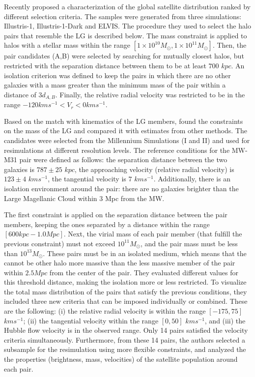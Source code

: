 \documentclass[fleqn,usenatbib]{mnras}
\begin{document}
Recently \cite{2018MNRAS.478.5533F} proposed a characterization of the
global satellite distribution ranked by different selection
criteria. The samples were generated from three simulations:
Illustris-1, Illustris-1-Dark and ELVIS. The procedure they used to
select the halo pairs that resemble the LG is described below. The
mass constraint is applied to halos with a stellar mass within the
range $[1\times 10^{10} M_\odot, 1\times 10^{11} M_\odot]$. Then, the
pair candidates (A,B) were selected by searching for mutually closest
halos, but restricted with the separation distance between them to be
at least $700$ $kpc$. An isolation criterion was defined to keep the
pairs in which there are no other galaxies with a mass greater than
the minimum mass of the pair within a distance of $3d_{A,B}$. Finally,
the relative radial velocity was restricted to be in the range $-120
kms^{-1}<V_r<0 km s^{-1}$.  


Based on the match with kinematics of the LG members, \cite{fattahi2016apostle} found the constraints on the mass of the LG and compared it with estimates from other methods. The candidates were selected from the Millennium Simulations (I and II) and used for resimulations at different resolution levels. The reference conditions for the MW-M31 pair were defined as follows: the separation distance between the two galaxies is $787 \pm 25$ $kpc$, the approaching velocity (relative radial velocity) is $123 \pm 4$ $kms^{-1}$, the tangential velocity is $7$ $kms^{-1}$. Additionally, there is an isolation environment around \cite{forero2018we}
the pair: there are no galaxies brighter than the Large Magellanic Cloud within 3 Mpc from the MW. 

The first constraint is applied on the separation distance between the pair members, keeping the ones separated by a distance within the range $[600kpc-1.0Mpc]$. Next, the virial mass of each pair member (that fulfill the previous constraint) must not exceed $10^{11} M_\odot$, and the pair mass must be less than $10^{13} M_\odot$. These pairs must be in an isolated medium, which means that the cannot be other halo more massive than the less massive member of the pair within $2.5Mpc$ from the center of the pair. They evaluated different values for this threshold distance, making the isolation more or less restricted. To visualize the total mass distribution of the pairs that satisfy the previous conditions, they included three new criteria that can be imposed individually or combined. These are the following: (i) the relative radial velocity is within the range $[-175,75]$ $kms^{-1}$; (ii) the tangential velocity within the range $[0,50]$ $kms^{-1}$, and (iii) the Hubble flow velocity is in the observed range. Only 14 pairs satisfied the velocity criteria simultaneously. Furthermore, from these 14 pairs, the authors selected a subsample for the resimulation using more flexible constraints, and analyzed the the properties (brightness, mass, velocities) of the satellite population around each pair.
\end{document}
